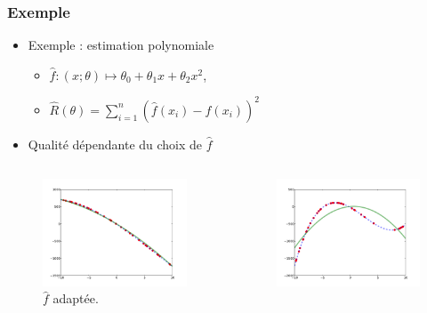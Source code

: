 \documentclass[c]{beamer}
\begin{document}
\begin{frame}
  \frametitle{Exemple}

  \begin{itemize}
    \item Exemple : estimation polynomiale
      \begin{itemize}
        \item $\hat{f} : (x; \theta) \mapsto \theta_0 + \theta_1 x + \theta_2 x^2$,
        \item $\hat{R}(\theta) = \sum_{i = 1}^n \left( \hat{f}(x_i) - f(x_i) \right)^2$
      \end{itemize}
    \item Qualit\'e d\'ependante du choix de $\hat{f}$
  \end{itemize}
  \begin{columns}
    \begin{column}{.5\textwidth}
      \begin{figure}
        \centering
        \includegraphics[width=.9\textwidth]{./figures/regression_good-choice.pdf}
        \caption{$\hat{f}$ adapt\'ee.}
      \end{figure}
    \end{column}
    \begin{column}{.5\textwidth}
      \begin{figure}
        \centering
        \includegraphics[width=.9\textwidth]{./figures/regression_poor-choice.pdf}

\end{figure}
\end{column}
\end{columns}
\end{frame}
\end{document}
